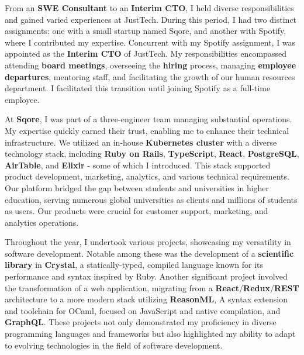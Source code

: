 
\bigskip

From an \textbf{SWE Consultant} to an \textbf{Interim CTO}, I held diverse responsibilities and gained varied experiences at JustTech. During this period, I had two distinct assignments: one with a small startup named Sqore, and another with Spotify, where I contributed my expertise. Concurrent with my Spotify assignment, I was appointed as the \textbf{Interim CTO} of JustTech. My responsibilities encompassed attending \textbf{board meetings}, overseeing the \textbf{hiring} process, managing \textbf{employee departures}, mentoring staff, and facilitating the growth of our human resources department. I facilitated this transition until joining Spotify as a full-time employee.
\medskip

At \textbf{Sqore}, I was part of a three-engineer team managing substantial operations. My expertise quickly earned their trust, enabling me to enhance their technical infrastructure. We utilized an in-house \textbf{Kubernetes cluster} with a diverse technology stack, including \textbf{Ruby on Rails}, \textbf{TypeScript}, \textbf{React}, \textbf{PostgreSQL}, \textbf{AirTable}, and \textbf{Elixir} - some of which I introduced. This stack supported product development, marketing, analytics, and various technical requirements. Our platform bridged the gap between students and universities in higher education, serving numerous global universities as clients and millions of students as users. Our products were crucial for customer support, marketing, and analytics operations.

\vfill
\divider
\vfill

Throughout the year, I undertook various projects, showcasing my versatility in software development. Notable among these was the development of a \textbf{scientific library} in \textbf{Crystal}, a statically-typed, compiled language known for its performance and syntax inspired by Ruby. Another significant project involved the transformation of a web application, migrating from a \textbf{React}/\textbf{Redux}/\textbf{REST} architecture to a more modern stack utilizing \textbf{ReasonML}, A syntax extension and toolchain for OCaml, focused on JavaScript and native compilation, and \textbf{GraphQL}.
These projects not only demonstrated my proficiency in diverse programming languages and frameworks but also highlighted my ability to adapt to evolving technologies in the field of software development.
\smallskip

